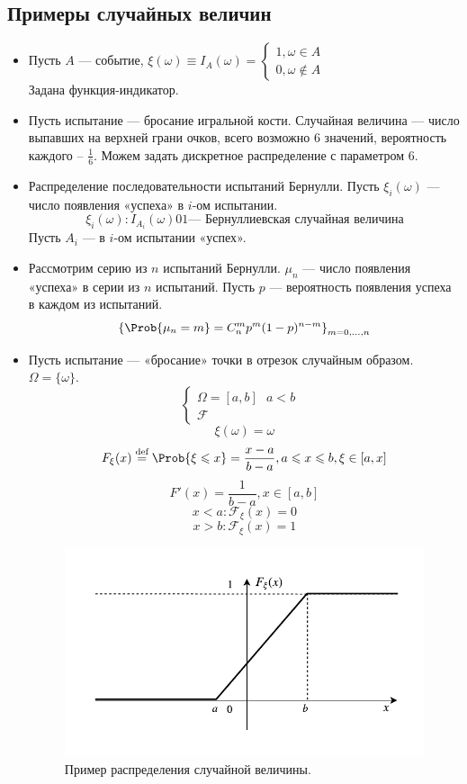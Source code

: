 \subsection{Примеры случайных величин}
\begin{itemize}
	\item Пусть $A$ --- событие, $\xi(\omega) \equiv I_A (\omega) = \begin{cases}
		1, \omega \in A \\
		0, \omega \not \in A
	\end{cases} $ \\
	Задана функция-индикатор.
	\item Пусть испытание --- бросание игральной кости. Случайная величина --- число выпавших на верхней грани очков, всего возможно 6 значений, вероятность каждого -- $\frac{1}{6}$. Можем задать дискретное распределение с параметром 6.
	\item Распределение последовательности испытаний Бернулли. Пусть $\xi_i (\omega)$ --- число появления «успеха» в $i$-ом испытании.
	\[
		\xi_i (\omega) : I_{A_i} (\omega) 0 1 \text{--- Бернуллиевская случайная величина}
	\]
	Пусть $A_i$ --- в $i$-ом испытании «успех».
	\item Рассмотрим серию из $n$ испытаний Бернулли. $\mu_n$ --- число появления «успеха» в серии из $n$ испытаний. Пусть $p$ --- вероятность появления успеха в каждом из испытаний.
	\[
		{\{ \Prob \{ \mu_n = m \} = C_n^m p^m (1-p)^{n-m} \}}_{m = 0, \ldots, n}
	\]
	\item Пусть испытание --- «бросание» точки в отрезок случайным образом. $\Omega = \{ \omega \}$.
	\[
		\begin{cases}
			\Omega = [a, b] \text{ $a < b$ } \\
			\mathcal{F}
		\end{cases}
	\]
	\[
		\xi (\omega) = \omega
	\]
	\[
		F_\xi (x) \overset{\textrm{def}}{=} \Prob \{ \xi \leqslant x \} = \frac{x - a}{b - a}, a \leqslant x \leqslant b, \xi \in [a, x]
	\]
	\[
		F' (x) = \frac{1}{b-a}, x \in [a, b]
	\]
	\[
		x < a : \mathcal{F}_\xi (x) = 0
	\]
	\[
		x > b : \mathcal{F}_\xi (x) = 1
	\]
\begin{figure}[H]
	\begin{center}
	\includegraphics[width=\textwidth,height=\textheight,keepaspectratio]{Images/plot2-5.pdf}
	\end{center}
	\caption{Пример распределения случайной величины.}
\end{figure}
\end{itemize}
\setcounter{equation}{0}
